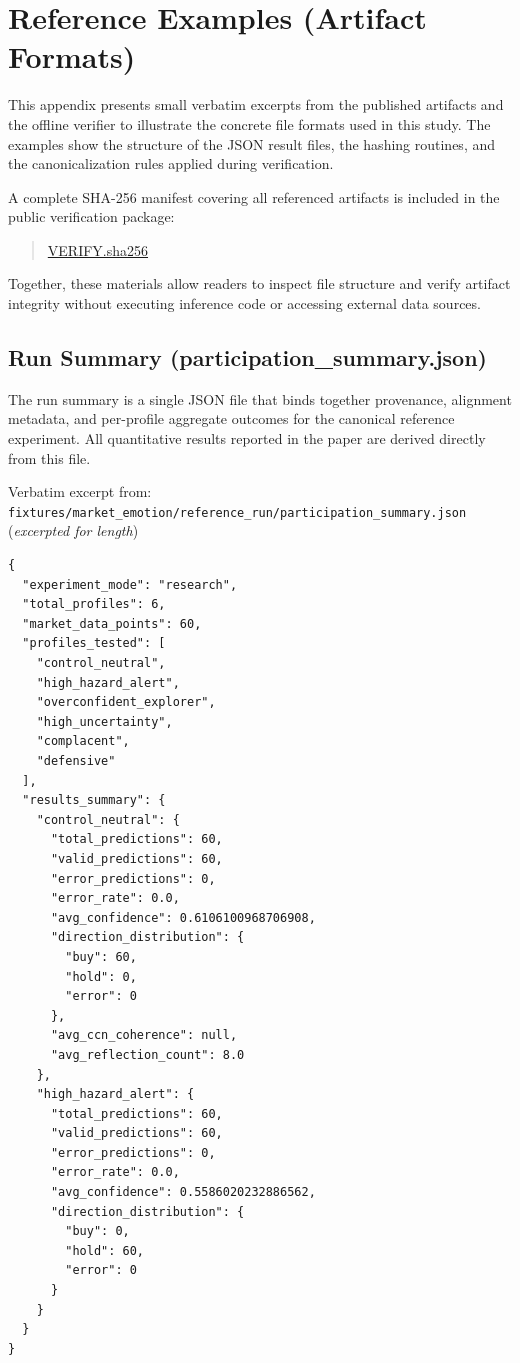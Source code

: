\documentclass[12pt,a4paper]{article}
\begin{document}
\appendix

\section{Reference Examples (Artifact Formats)}

This appendix presents small verbatim excerpts from the published artifacts and the offline verifier to illustrate the concrete file formats used in this study. The examples show the structure of the JSON result files, the hashing routines, and the canonicalization rules applied during verification.

A complete SHA-256 manifest covering all referenced artifacts is included in the public verification package:
\begin{quote}
\href{https://github.com/jhcragin/SpiralBrain-v3.0-public/blob/main/Emotion-Conditioned%20Risk%20Posture%20in%20Crypto%20Markets/results/VERIFY.sha256}{VERIFY.sha256}
\end{quote}

Together, these materials allow readers to inspect file structure and verify artifact integrity without executing inference code or accessing external data sources.

\subsection{Run Summary (participation\_summary.json)}

The run summary is a single JSON file that binds together provenance, alignment metadata, and per-profile aggregate outcomes for the canonical reference experiment. All quantitative results reported in the paper are derived directly from this file.

Verbatim excerpt from:\\
\texttt{fixtures/market\_emotion/reference\_run/participation\_summary.json}
(\emph{excerpted for length})

\begin{Verbatim}[fontsize=\small,breaklines=true,breakanywhere=true]
{
  "experiment_mode": "research",
  "total_profiles": 6,
  "market_data_points": 60,
  "profiles_tested": [
    "control_neutral",
    "high_hazard_alert",
    "overconfident_explorer",
    "high_uncertainty",
    "complacent",
    "defensive"
  ],
  "results_summary": {
    "control_neutral": {
      "total_predictions": 60,
      "valid_predictions": 60,
      "error_predictions": 0,
      "error_rate": 0.0,
      "avg_confidence": 0.6106100968706908,
      "direction_distribution": {
        "buy": 60,
        "hold": 0,
        "error": 0
      },
      "avg_ccn_coherence": null,
      "avg_reflection_count": 8.0
    },
    "high_hazard_alert": {
      "total_predictions": 60,
      "valid_predictions": 60,
      "error_predictions": 0,
      "error_rate": 0.0,
      "avg_confidence": 0.5586020232886562,
      "direction_distribution": {
        "buy": 0,
        "hold": 60,
        "error": 0
      }
    }
  }
}
\end{Verbatim}
\end{document}
